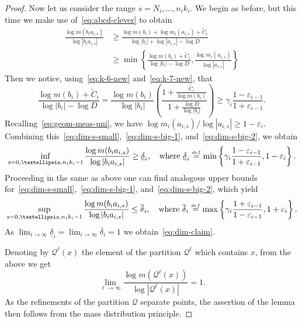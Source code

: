 \documentclass[10pt,a4paper]{amsart}
\newcommand{\cQ}{{\mathcal Q}}
\newcommand{\eps}{\varepsilon}
\newcommand{\eqdef}{\stackrel{\scriptscriptstyle\rm def}{=}}
\begin{document}
\begin{proof}
  Now let us consider the range $s = N_i, \ldots ,n_{i}k_i$. We begin as before, but this time we make use of~\eqref{eq:abcd-clever} to obtain
  \begin{align}
    \nonumber
    \frac{
      \log m ( b_i a_{i,s})
    }
    {
      \log |b_i a_{i,s}|
    }
    &\ge 
    \frac{ \log m ( b_i ) + \log m_i (a_{i,s}) + \widetilde C_i }
    { \log |b_{i}|  + \log |a_{i,s}| - \log D } \\
    \label{eq:dim-s-big-1}
    &\ge
    \min\left\{
    \frac{ \log m ( b_i ) + \widetilde C_i }
    { \log |b_{i}|  - \log D },
    \frac{ \log m_i (a_{i,s}) }
    {  \log |a_{i,s}| } 
    \right\}
  \end{align}
  Then we notice, using~\eqref{eq:k-6-new} and~\eqref{eq:k-7-new}, that
  \begin{equation}
    \label{eq:dim-s-big-2}
    \frac{ \log m ( b_i ) + \widetilde C_i }
    { \log |b_{i}|  - \log D }
    =
    \frac{ \log m ( b_i )}
    { \log |b_{i}|  }
    \left(
    \frac{ 1 + \frac{\widetilde C_i}{\log m ( b_i )} }
    { 1 + \frac{\log D }{\log |b_{i}|}}
    \right)
    \ge \gamma_i \frac{ 1 - \eps_{ i - 1 } }{ 1 + \eps_{ i - 1 } }.
  \end{equation}
  Recalling~\eqref{eq:geom-meas-uni}, we have $\log m_i (a_{i,s}) / \log |a_{i,s}| \ge 1 - \eps_i$. Combining this~\eqref{eq:dim-s-small},~\eqref{eq:dim-s-big-1}, and~\eqref{eq:dim-s-big-2}, we obtain
  \[
    \inf_{s = 0 ,\ldots, n_i k_i - 1} \frac{ \log m ( b_i a_{i,s} ) }{ \log |b_i a_{i,s}|} \ge \underline{\delta}_i,
    \quad
    \text{where }
    \underline{\delta}_i \eqdef
    \min\left\{
    \gamma_i \frac{ 1 - \eps_{ i - 1 }} {1  + \eps_{i - 1 }},
    1  - \eps_i
    \right\}.
  \]
  Proceeding in the same as above one can find analogous upper bounds for~\eqref{eq:dim-s-small},~\eqref{eq:dim-s-big-1}, and~\eqref{eq:dim-s-big-2}, which yield
  \[
    \sup_{s = 0 ,\ldots, n_i k_i - 1} \frac{ \log m ( b_i a_{i,s} ) }{ \log |b_i a_{i,s}|} \le \overline{\delta}_i,
    \quad
    \text{where }
    \overline{\delta}_i \eqdef
    \max\left\{
    \gamma_i \frac{ 1 + \eps_{ i - 1 }} {1  -  \eps_{i - 1 }},
    1  + \eps_i
    \right\}.
  \]
  As $\lim_{i \to \infty} \underline{\delta}_i = \lim_{ i \to \infty } \overline{\delta}_i = 1$ we obtain~\eqref{eq:dim-claim}.

  Denoting by $\cQ^\ell(x)$ the element of the partition $\cQ^\ell$ which contains $x$, from the above we get
  \[
    \lim_{\ell \to \infty}\frac{ \log m ( \cQ^{\ell}(x) ) }{ \log|\cQ^{\ell}(x)|} = 1.
  \]
  As the refinements of the partition $\cQ$ separate points, the assertion of the lemma then follows from the mass distribution principle.
\end{proof}
\end{document}

